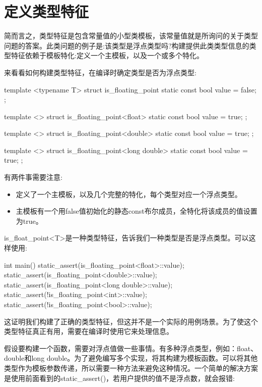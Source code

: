 \section{定义类型特征}
简而言之，类型特征是包含常量值的小型类模板，该常量值就是所询问的关于类型问题的答案。此类问题的例子是:该类型是浮点类型吗?构建提供此类类型信息的类型特征依赖于模板特化:定义一个主模板，以及一个或多个特化。

来看看如何构建类型特征，在编译时确定类型是否为浮点类型:

\begin{cpp}
template <typename T>
struct is_floating_point
{
	static const bool value = false;
};

template <>
struct is_floating_point<float>
{
	static const bool value = true;
};

template <>
struct is_floating_point<double>
{
	static const bool value = true;
};

template <>
struct is_floating_point<long double>
{
	static const bool value = true;
};
\end{cpp}

有两件事需要注意:

\begin{itemize}
\item
定义了一个主模板，以及几个完整的特化，每个类型对应一个浮点类型。

\item
主模板有一个用false值初始化的静态const布尔成员，全特化将该成员的值设置为true。
\end{itemize}

is\_float\_point<T>是一种类型特征，告诉我们一种类型是否是浮点类型。可以这样使用:

\begin{cpp}
int main()
{
	static_assert(is_floating_point<float>::value);
	static_assert(is_floating_point<double>::value);
	static_assert(is_floating_point<long double>::value);
	static_assert(!is_floating_point<int>::value);
	static_assert(!is_floating_point<bool>::value);
}
\end{cpp}

这证明我们构建了正确的类型特征，但这并不是一个实际的用例场景。为了使这个类型特征真正有用，需要在编译时使用它来处理信息。

假设要构建一个函数，需要对浮点值做一些事情。有多种浮点类型，例如：float、double和long double。为了避免编写多个实现，将其构建为模板函数。可以将其他类型作为模板参数传递，所以需要一种方法来避免这种情况。一个简单的解决方案是使用前面看到的static\_assert()，若用户提供的值不是浮点数，就会报错:

